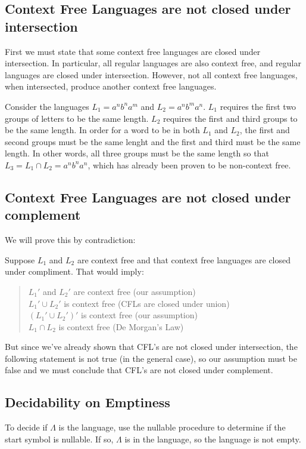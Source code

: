 \documentclass[letterpaper,12pt,openany,reqno]{book}%
\begin{document}
\subsection {Context Free Languages are not closed under intersection}
First we must state that some context free languages are closed under intersection. In particular, all regular languages are also context free, and regular languages are closed under intersection. However, not all context free languages, when intersected, produce another context free languages. 

Consider the languages $L_1 = a^nb^na^m$ and $L_2 = a^nb^ma^n$. $L_1$ requires the first two groups of letters to be the same length. $L_2$ requires the first and third groups to be the same length. In order for a word to be in both $L_1$ and $L_2$, the first and second groups must be the same lenght and the first and third must be the same length. In other words, all three groups must be the same length so that $L_3 = L_1 \cap L_2 = a^nb^na^n$, which has already been proven to be non-context free.

\subsection {Context Free Languages are not closed under complement}
We will prove this by contradiction:

Suppose $L_1$ and $L_2$ are context free and that context free languages are closed under compliment. That would imply:
\begin{quote}
$L_1'$ and $L_2'$ are context free (our assumption)\\
$L_1' \cup L_2'$ is context free (CFLs are closed under union)\\
$(L_1' \cup L_2')'$ is context free (our assumption)\\
$L_1 \cap L_2$ is context free (De Morgan's Law)
\end{quote}
But since we've already shown that CFL's are not closed under intersection, the following statement is not true (in the general case), so our assumption must be false and we must conclude that CFL's are not closed under complement.

\subsection {Decidability on Emptiness}
To decide if $\Lambda$ is the language, use the nullable procedure to determine if the start symbol is nullable. If so, $\Lambda$ is in the language, so the language is not empty.
\end{document}
